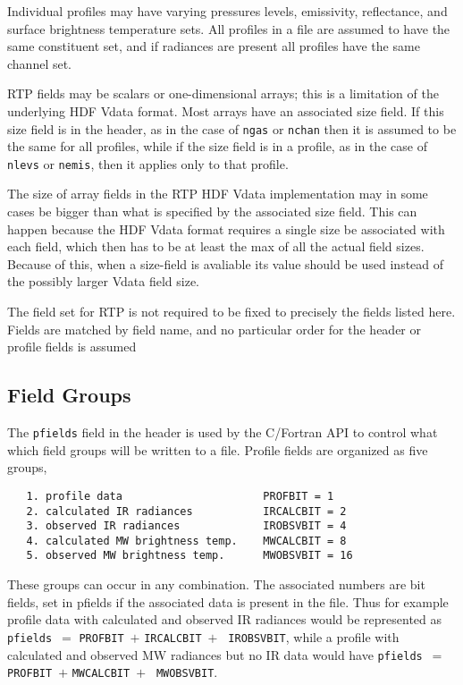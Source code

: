 \documentclass[12pt]{article}
\begin{document}
Individual profiles may have varying pressures levels, emissivity,
reflectance, and surface brightness temperature sets.  All profiles
in a file are assumed to have the same constituent set, and if
radiances are present all profiles have the same channel set.

RTP fields may be scalars or one-dimensional arrays; this is a
limitation of the underlying HDF Vdata format.  Most arrays have an
associated size field.  If this size field is in the header, as in
the case of {\tt ngas} or {\tt nchan} then it is assumed to be the
same for all profiles, while if the size field is in a profile, as
in the case of {\tt nlevs} or {\tt nemis}, then it applies only to
that profile.

The size of array fields in the RTP HDF Vdata implementation may in
some cases be bigger than what is specified by the associated size
field.  This can happen because the HDF Vdata format requires a
single size be associated with each field, which then has to be at
least the max of all the actual field sizes.  Because of this, when
a size-field is avaliable its value should be used instead of the
possibly larger Vdata field size.

The field set for RTP is not required to be fixed to precisely the
fields listed here.  Fields are matched by field name, and no
particular order for the header or profile fields is assumed


\subsection{Field Groups}

The {\tt pfields} field in the header is used by the C/Fortran API
to control what which field groups will be written to a file.  Profile
fields are organized as five groups,

\begin{verbatim}
   1. profile data                      PROFBIT = 1
   2. calculated IR radiances           IRCALCBIT = 2
   3. observed IR radiances             IROBSVBIT = 4
   4. calculated MW brightness temp.    MWCALCBIT = 8
   5. observed MW brightness temp.      MWOBSVBIT = 16
\end{verbatim}

These groups can occur in any combination.  The associated numbers
are bit fields, set in pfields if the associated data is present
in the file.  Thus for example profile data with calculated and
observed IR radiances would be represented as
{\tt pfields}~$=$ {\tt PROFBIT}~$+$ {\tt IRCALCBIT}~$+$ {\tt
IROBSVBIT},
while a profile with calculated and observed MW radiances but no
IR data would have 
{\tt pfields}~$=$ {\tt PROFBIT}~$+$ {\tt MWCALCBIT}~$+$ {\tt
MWOBSVBIT}.
\end{document}
